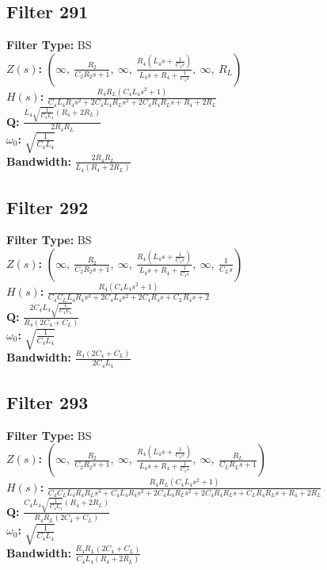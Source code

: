 \documentclass{article}
\begin{document}
\subsection*{Filter 291}
\textbf{Filter Type:} BS \\ 
\textbf{$Z(s)$:} $\left( \infty, \  \frac{R_{2}}{C_{2} R_{2} s + 1}, \  \infty, \  \frac{R_{4} \left(L_{4} s + \frac{1}{C_{4} s}\right)}{L_{4} s + R_{4} + \frac{1}{C_{4} s}}, \  \infty, \  R_{L}\right)$ \\ 
\textbf{$H(s)$:} $\frac{R_{4} R_{L} \left(C_{4} L_{4} s^{2} + 1\right)}{C_{4} L_{4} R_{4} s^{2} + 2 C_{4} L_{4} R_{L} s^{2} + 2 C_{4} R_{4} R_{L} s + R_{4} + 2 R_{L}}$ \\ 
\textbf{Q:} $\frac{L_{4} \sqrt{\frac{1}{C_{4} L_{4}}} \left(R_{4} + 2 R_{L}\right)}{2 R_{4} R_{L}}$ \\ 
\textbf{$\omega_0$:} $\sqrt{\frac{1}{C_{4} L_{4}}}$ \\ 
\textbf{Bandwidth:} $\frac{2 R_{4} R_{L}}{L_{4} \left(R_{4} + 2 R_{L}\right)}$ \\ 
\subsection*{Filter 292}
\textbf{Filter Type:} BS \\ 
\textbf{$Z(s)$:} $\left( \infty, \  \frac{R_{2}}{C_{2} R_{2} s + 1}, \  \infty, \  \frac{R_{4} \left(L_{4} s + \frac{1}{C_{4} s}\right)}{L_{4} s + R_{4} + \frac{1}{C_{4} s}}, \  \infty, \  \frac{1}{C_{L} s}\right)$ \\ 
\textbf{$H(s)$:} $\frac{R_{4} \left(C_{4} L_{4} s^{2} + 1\right)}{C_{4} C_{L} L_{4} R_{4} s^{3} + 2 C_{4} L_{4} s^{2} + 2 C_{4} R_{4} s + C_{L} R_{4} s + 2}$ \\ 
\textbf{Q:} $\frac{2 C_{4} L_{4} \sqrt{\frac{1}{C_{4} L_{4}}}}{R_{4} \left(2 C_{4} + C_{L}\right)}$ \\ 
\textbf{$\omega_0$:} $\sqrt{\frac{1}{C_{4} L_{4}}}$ \\ 
\textbf{Bandwidth:} $\frac{R_{4} \left(2 C_{4} + C_{L}\right)}{2 C_{4} L_{4}}$ \\ 
\subsection*{Filter 293}
\textbf{Filter Type:} BS \\ 
\textbf{$Z(s)$:} $\left( \infty, \  \frac{R_{2}}{C_{2} R_{2} s + 1}, \  \infty, \  \frac{R_{4} \left(L_{4} s + \frac{1}{C_{4} s}\right)}{L_{4} s + R_{4} + \frac{1}{C_{4} s}}, \  \infty, \  \frac{R_{L}}{C_{L} R_{L} s + 1}\right)$ \\ 
\textbf{$H(s)$:} $\frac{R_{4} R_{L} \left(C_{4} L_{4} s^{2} + 1\right)}{C_{4} C_{L} L_{4} R_{4} R_{L} s^{3} + C_{4} L_{4} R_{4} s^{2} + 2 C_{4} L_{4} R_{L} s^{2} + 2 C_{4} R_{4} R_{L} s + C_{L} R_{4} R_{L} s + R_{4} + 2 R_{L}}$ \\ 
\textbf{Q:} $\frac{C_{4} L_{4} \sqrt{\frac{1}{C_{4} L_{4}}} \left(R_{4} + 2 R_{L}\right)}{R_{4} R_{L} \left(2 C_{4} + C_{L}\right)}$ \\ 
\textbf{$\omega_0$:} $\sqrt{\frac{1}{C_{4} L_{4}}}$ \\ 
\textbf{Bandwidth:} $\frac{R_{4} R_{L} \left(2 C_{4} + C_{L}\right)}{C_{4} L_{4} \left(R_{4} + 2 R_{L}\right)}$ \\ 
\end{document}
